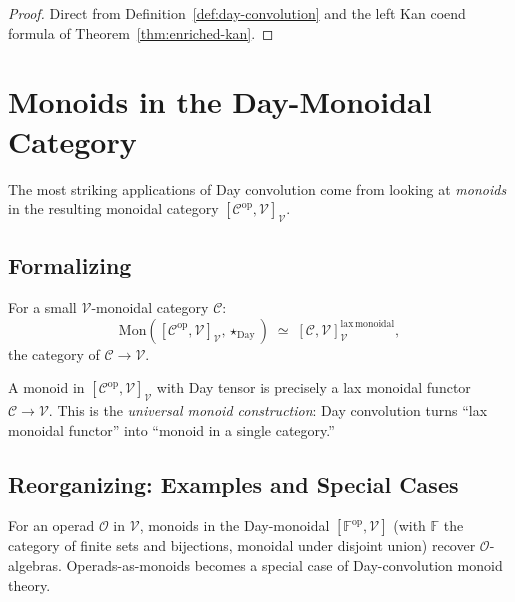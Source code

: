 \begin{proof}
Direct from Definition~\ref{def:day-convolution} and the left Kan coend
formula of Theorem~\ref{thm:enriched-kan}.
\end{proof}


\section{Monoids in the Day-Monoidal Category}
\label{sec:day-monoids}

The most striking applications of Day convolution come from looking at
\emph{monoids} in the resulting monoidal category $[\mathcal{C}^{\mathrm{op}},
\mathcal{V}]_\mathcal{V}$.

\subsection{Formalizing}

\begin{theorem}
\label{thm:day-monoids}
For a small $\mathcal{V}$-monoidal category $\mathcal{C}$:
\begin{equation*}
  \mathrm{Mon}([\mathcal{C}^{\mathrm{op}}, \mathcal{V}]_\mathcal{V},
  \star_{\mathrm{Day}})
  \;\simeq\;
  [\mathcal{C}, \mathcal{V}]_\mathcal{V}^{\mathrm{lax\,monoidal}},
\end{equation*}
the category of  $\mathcal{C} \to
\mathcal{V}$.
\end{theorem}

\begin{remark}[Interpretation]
A monoid in $[\mathcal{C}^{\mathrm{op}}, \mathcal{V}]_\mathcal{V}$ with Day
tensor is precisely a lax monoidal functor $\mathcal{C} \to \mathcal{V}$.
This is the \emph{universal monoid construction}: Day convolution turns
``lax monoidal functor'' into ``monoid in a single category.''
\end{remark}

\subsection{Reorganizing: Examples and Special Cases}

\begin{example_thm}
For an operad $\mathcal{O}$ in $\mathcal{V}$, monoids in the Day-monoidal
$[\mathbb{F}^{\mathrm{op}}, \mathcal{V}]$ (with $\mathbb{F}$ the category of
finite sets and bijections, monoidal under disjoint union) recover
$\mathcal{O}$-algebras. Operads-as-monoids becomes a special case of
Day-convolution monoid theory.
\end{example_thm}


